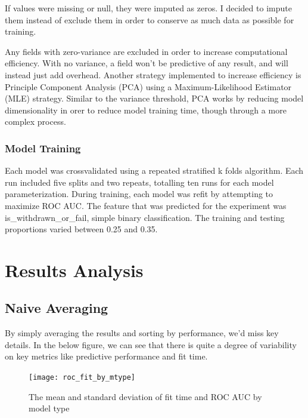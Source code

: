 \documentclass{article}
\begin{document}
                If values were missing or null, they were imputed as zeros.
                I decided to impute them instead of exclude them in order to conserve as much data as possible for training.
                
                Any fields with zero-variance are excluded in order to increase computational efficiency.
                With no variance, a field won't be predictive of any result, and will instead just add overhead.
                Another strategy implemented to increase efficiency is Principle Component Analysis (PCA) using a Maximum-Likelihood Estimator (MLE) strategy.
                Similar to the variance threshold, PCA works by reducing model dimensionality in orer to reduce model training time, though through a more complex process. 
            
            \subsubsection{Model Training}
                Each model was crossvalidated using a repeated stratified k folds algorithm.
                Each run included five splits and two repeats, totalling ten runs for each model parameterization.
                During training, each model was refit by attempting to maximize ROC AUC.
                The feature that was predicted for the experiment was is\_withdrawn\_or\_fail, simple binary classification.
                The training and testing proportions varied between 0.25 and 0.35.


\section{Results Analysis}
    \subsection{Naive Averaging}
            By simply averaging the results and sorting by performance, we'd miss key details.
            In the below figure, we can see that there is quite a degree of variability on key metrics like predictive performance and fit time.
        \begin{figure}
            \centering
            \texttt{[image: roc\_fit\_by\_mtype]}
            \caption{The mean and standard deviation of fit time and ROC AUC by model type}
            \label{fig:roc_fit_by_mtype}
        \end{figure}
\end{document}
